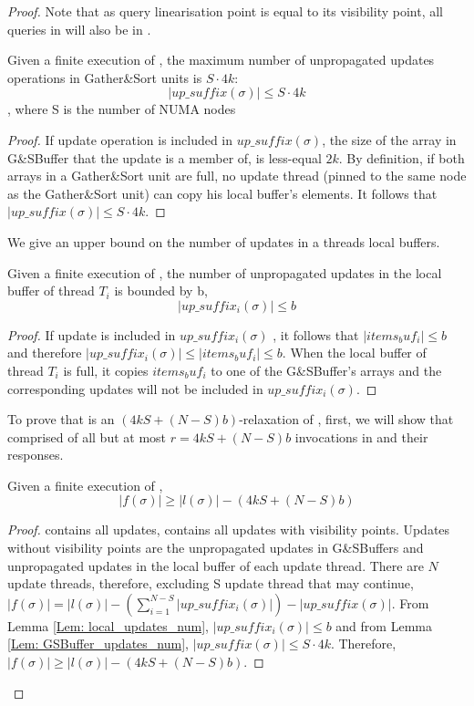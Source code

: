\begin{proof}
Note that as query linearisation point is equal to its visibility point, all queries in \fs will also be in \ls. 

\begin{lemma}\label{Lem: GSBuffer_updates_num}
Given a finite execution \s of \mysketch, the maximum number of unpropagated updates operations in Gather\&Sort units is \(S \cdot 4k\): \[|up\_suffix(\sigma)| \leq S \cdot 4k\], where S is the number of NUMA nodes
\end{lemma}
\begin{proof}
If update operation is included in \(up\_suffix(\sigma)\), the size of the array in G\&SBuffer that the update is a member of, is less-equal $2k$. By definition, if both arrays in a Gather\&Sort unit are full, no update thread (pinned to the same node as the Gather\&Sort unit) can copy his local buffer's elements. It follows that \(|up\_suffix(\sigma)| \leq S\cdot4k\).
\end{proof}

We give an upper bound on the number of updates in a threads local buffers.

\begin{lemma}\label{Lem: local_updates_num}
Given a finite execution \s of \mysketch, the number of unpropagated updates in the local buffer of thread \(T_i\) is bounded by b, \[|up\_suffix_i(\sigma)| \leq b\]
\end{lemma}
\begin{proof}
If update is included in \(up\_suffix_i(\sigma)\) , it follows that \(|items_buf_i| \leq b\) and therefore \(|up\_suffix_i(\sigma)| \leq |items_buf_i| \leq b \). When the local buffer of thread \(T_i\) is full, it copies \(items_buf_i\) to one of the G\&SBuffer's arrays and the corresponding updates will not be included in \(up\_suffix_i(\sigma)\).
\end{proof}

To prove that \fs is an \((4kS + (N-S)b)\)-relaxation of \ls, first, we will show that \fs comprised of all but at most \(r=4kS + (N-S)b\) invocations in \ls and their responses.

\begin{lemma} \label{Lem: invocations_bound}
Given a finite execution \s of \mysketch, \[ |f(\sigma)| \ge |l(\sigma)| - (4kS + (N-S)b) \]
\end{lemma}
\begin{proof}
\ls contains all updates, \fs contains all updates with visibility points. Updates without visibility points are the unpropagated updates in G\&SBuffers and unpropagated updates in the local buffer of each update thread. There are \(N\) update threads, therefore, excluding S update thread that may continue, \(|f(\sigma)| = |l(\sigma)| - (\sum_{i=1}^{N-S}|up\_suffix_i(\sigma)|) - |up\_suffix(\sigma)|\). From Lemma \ref{Lem: local_updates_num}, \(|up\_suffix_i(\sigma)| \leq b\) and from Lemma \ref{Lem: GSBuffer_updates_num}, \(|up\_suffix(\sigma)| \leq S \cdot 4k\). Therefore, \(|f(\sigma)| \ge |l(\sigma)| - (4kS + (N-S)b)\).
\end{proof}


\end{proof}
